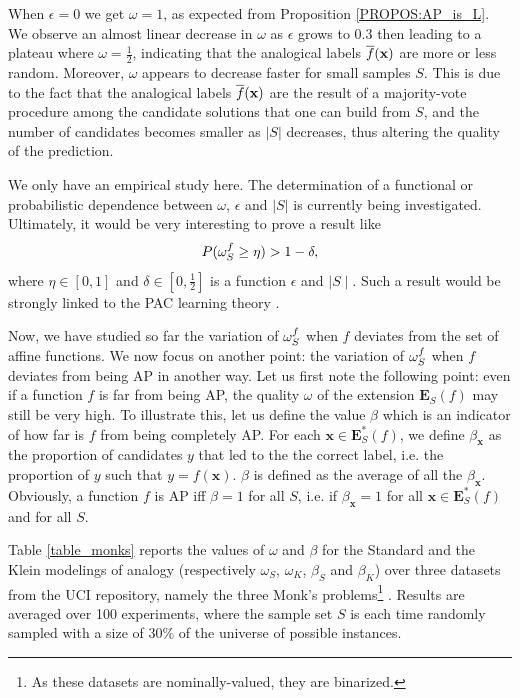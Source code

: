 When $\epsilon = 0$ we get $\omega = 1$, as expected from
Proposition \ref{PROPOS:AP_is_L}. We observe an almost linear decrease in $\omega$ as
$\epsilon$ grows to $0.3$ then leading to a plateau where $\omega =
\frac{1}{2}$, indicating that the analogical labels $\overline{f}(\mathbf{x})$ are
more or less random. Moreover, $\omega$ appears to decrease faster for small
samples $S$. This is due to the fact that the analogical labels
$\overline{f}(\mathbf{x})$ are the result of a majority-vote procedure among the
candidate solutions that one can build from $S$, and the number of candidates
becomes smaller as $|S|$ decreases, thus altering the quality of the
prediction.

We only have an empirical study here.  The determination of a functional or
probabilistic dependence between $\omega$, $\epsilon$ and $|S|$ is currently
being investigated. Ultimately, it would be very interesting to prove a result
like
$$P(\omega_{S}^{f} \geq \eta) > 1 - \delta,$$
where $\eta \in [0, 1]$ and $\delta \in [0, \frac{1}{2}]$ is a function
$\epsilon$ and $\mid S \mid$. Such a result would be strongly linked to the PAC
learning theory \cite{Val72}.



Now, we have studied so far the variation of $\omega_{S}^{f}$ when $f$ deviates from
the set of affine functions. We now focus on another point: the variation of
$\omega_{S}^{f}$ when $f$ deviates from being AP in another way.
Let us first note the following point: even if a function $f$ is far from being
AP, the quality $\omega$ of the extension $\mathbf{E}_S(f)$ may still be very
high. To illustrate this, let us define the value $\beta$ which is an indicator
of how far is $f$ from being completely AP.  For each $\mathbf{x} \in
\mathbf{E}^*_S(f)$, we define $\beta_\mathbf{x}$ as the proportion of
candidates $y$ that led to the the correct label, i.e. the proportion of $y$
such that $y = f(\mathbf{x})$. $\beta$ is defined as the average of all the
$\beta_\mathbf{x}$.  Obviously, a function $f$ is AP iff $\beta = 1$ for all
$S$, i.e. if $\beta_\mathbf{x} = 1$ for all $\mathbf{x} \in \mathbf{E}^*_S(f)$
and for all $S$.

Table \ref{table_monks} reports the values of $\omega$ and $\beta$ for the
Standard and the Klein modelings of analogy (respectively $\omega_S$,
$\omega_K$, $\beta_S$ and $\beta_K$) over three datasets from the UCI
repository, namely the three Monk's problems\footnote{As these datasets are
nominally-valued, they are binarized.} \cite{UCIrepo}. Results are averaged
over 100 experiments, where the sample set $S$ is each time randomly sampled
with a size of $30$\% of the universe of possible instances.


